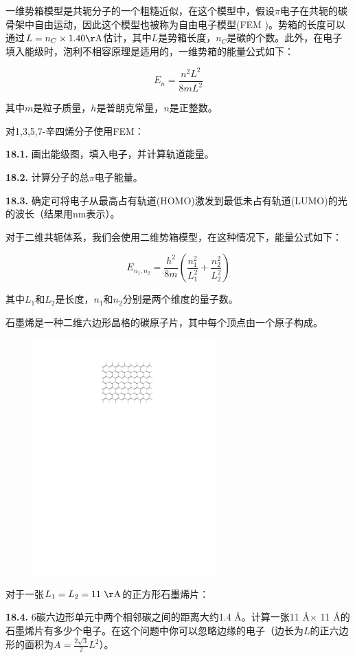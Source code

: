 一维势箱模型是共轭分子的一个粗糙近似，在这个模型中，假设$\pi$电子在共轭的碳骨架中自由运动，因此这个模型也被称为自由电子模型(FEM )。势箱的长度可以通过$L=n_C\times1.40\mathrm{\AA}$估计，其中$L$是势箱长度，$n_C$是碳的个数。此外，在电子填入能级时，泡利不相容原理是适用的，一维势箱的能量公式如下：

$$
E_n=\frac{n^2L^2}{8mL^2}
$$

\noindent 其中$m$是粒子质量，$h$是普朗克常量，$n$是正整数。

对1,3,5,7-辛四烯分子使用FEM：

\noindent\textbf{18.1.} 画出能级图，填入电子，并计算轨道能量。

\noindent\textbf{18.2.} 计算分子的总$\pi$电子能量。

\noindent\textbf{18.3.}
确定可将电子从最高占有轨道(HOMO)激发到最低未占有轨道(LUMO)的光的波长（结果用nm表示）。

对于二维共轭体系，我们会使用二维势箱模型，在这种情况下，能量公式如下：

$$
E_{n_1,n_2}=\frac{h^2}{8m}\left(\frac{n^2_1}{L_1^2}+\frac{n^2_2}{L_2^2}\right)
$$

\noindent 其中$L_1$和$L_2$是长度，$n_1$和$n_2$分别是两个维度的量子数。

石墨烯是一种二维六边形晶格的碳原子片，其中每个顶点由一个原子构成。

\begin{figure}[h]
	\centering
	\includegraphics[width=7cm]{./pic/t18-1.pdf}
\end{figure}

对于一张$L_1=L_2=11\ \mathrm{\AA}$的正方形石墨烯片：

\noindent\textbf{18.4.}
6碳六边形单元中两个相邻碳之间的距离大约1.4 \AA。计算一张11 \AA $\times$ 11 \AA 的石墨烯片有多少个电子。在这个问题中你可以忽略边缘的电子（边长为$L$的正六边形的面积为$A=\frac{2\sqrt3}{2}L^2$）。

